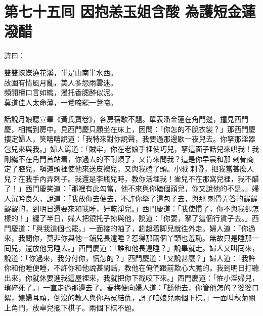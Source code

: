 
\chapter*{第七十五囘 因抱恙玉姐含酸 為護短金蓮潑醋}


詩曰：

\begin{myquote} 
雙雙蛺蝶遶花溪，半是山南半水西。\\故園有情風月亂，美人多怨雨雲迷。\\頻開檀口言如織，漫托香腮醉似泥。\\莫道佳人太命薄，一鶯啼罷一鶯啼。
\end{myquote} 

話說月娘聽宣畢《黃氏寶卷》，各房宿歇不題。單表潘金蓮在角門邊，撞見西門慶，相攜到房中。見西門慶只顧坐在床上，{}因問：「你怎的不脫衣裳？」那西門慶摟定婦人，笑嘻嘻說道：「我特來對你說聲，我要過那邊歇一夜兒去。你拏那淫器包兒來與我。」婦人罵道：「賊牢，你在老娘手裡使巧兒，拏這面子話兒來哄我！{}我剛纔不在角門首站着，你過去的不耐煩了，又肯來問我？這是你早晨和那𢱉剌骨商定了腔兒，嗔道頭裡使他來送皮襖兒，又與我磕了頭。小賊𢱉剌骨，把我當甚麼人兒？在我手內弄剌子。我還是李瓶兒時，教你活埋我！{}雀兒不在那窩兒裡，我不醋了！」{}西門慶笑道：「那裡有此勾當，他不來與你磕個頭兒，你又說他的不是。」婦人沉吟良久，說道：「我放你去便去，{}不許你拏了這包子去，{}與那𢱉剌骨弄答的齷齷齪齪的，到明日還要來和我睡，好乾淨兒。」{}西門慶道：「我使慣了，你不與我卻怎樣的！」纏了半日，婦人把銀托子掠與他，說道：「你要，拏了這個行貨子去。」西門慶道：「與我這個也罷。」一面接的袖了，趔趄着脚兒就徃外走。婦人道：「你過來，我問你，莫非你與他一鋪兒長遠睡？惹得那兩個丫頭也羞恥。無故只是睡那一囘兒，還放他另睡去。」西門慶道：「誰和他長遠睡？」說畢就走。婦人又叫囘來，說道：「你過來，我分付你，慌怎的？」{}西門慶道：「又說甚麼？」婦人道：「我許你和他睡便睡，不許你和他說甚閑話，教他在俺們跟前欺心大膽的。我到明日打聽出來，你就休要進我這屋裡來，我就把你下截咬下來。」{}西門慶道：「恠小淫婦兒，瑣碎死了。」一直走過那邊去了。春梅便向婦人道：「繇他去，你管他怎的？婆婆口絮，媳婦耳頑，倒沒的教人與你為冤結仇，{}誤了咱娘兒兩個下棋。」一面叫秋菊關上角門，放卓兒擺下棋子。兩個下棋不題。


